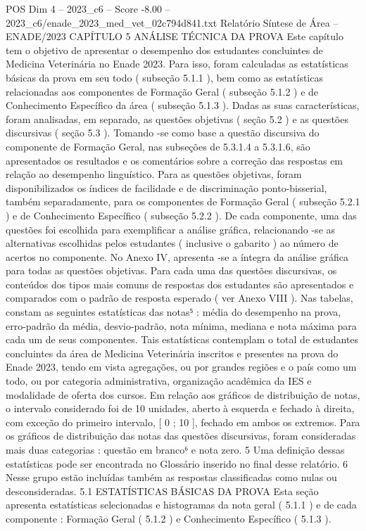 \begin{textsample}{POS Dim 4 – 2023\_c6 – Score -8.00 – 2023\_c6/enade\_2023\_med\_vet\_02c794d841.txt}  \label{ex:f4_pos_346}
Relatório Síntese de Área – ENADE/2023 CAPÍTULO 5 ANÁLISE TÉCNICA DA PROVA Este capítulo tem o objetivo de apresentar o desempenho dos estudantes concluintes de Medicina Veterinária no Enade 2023.
Para isso, foram calculadas as estatísticas básicas da prova em seu todo ( subseção 5.1.1 ), bem como as estatísticas relacionadas aos componentes de Formação Geral ( subseção 5.1.2 ) e de Conhecimento Específico da área ( subseção 5.1.3 ).
Dadas as suas características, foram analisadas, em separado, as questões objetivas ( seção 5.2 ) e as questões discursivas ( seção 5.3 ).
Tomando -se como base a questão discursiva do componente de Formação Geral, nas subseções de 5.3.1.4 a 5.3.1.6, são apresentados os resultados e os comentários sobre a correção das respostas em relação ao desempenho linguístico.
Para as questões objetivas, foram disponibilizados os índices de facilidade e de discriminação ponto-bisserial, também separadamente, para os componentes de Formação Geral ( subseção 5.2.1 ) e de Conhecimento Específico ( subseção 5.2.2 ).
De cada componente, uma das questões foi escolhida para exemplificar a análise gráfica, relacionando -se as alternativas escolhidas pelos estudantes ( inclusive o gabarito ) ao número de acertos no componente.
No Anexo IV, apresenta -se a íntegra da análise gráfica para todas as questões objetivas.
Para cada uma das questões discursivas, os conteúdos dos tipos mais comuns de respostas dos estudantes são apresentados e comparados com o padrão de resposta esperado ( ver Anexo VIII ).
Nas tabelas, constam as seguintes estatísticas das notas⁵ : média do desempenho na prova, erro-padrão da média, desvio-padrão, nota mínima, mediana e nota máxima para cada um de seus componentes.
Tais estatísticas contemplam o total de estudantes concluintes da área de Medicina Veterinária inscritos e presentes na prova do Enade 2023, tendo em vista agregações, ou por grandes regiões e o país como um todo, ou por categoria administrativa, organização acadêmica da IES e modalidade de oferta dos cursos.
Em relação aos gráficos de distribuição de notas, o intervalo considerado foi de 10 unidades, aberto à esquerda e fechado à direita, com exceção do primeiro intervalo, [ 0 ; 10 ], fechado em ambos os extremos.
Para os gráficos de distribuição das notas das questões discursivas, foram consideradas mais duas categorias : questão em branco⁶ e nota zero. 5 Uma definição dessas estatísticas pode ser encontrada no Glossário inserido no final desse relatório. 6 Nesse grupo estão incluídas também as respostas classificadas como nulas ou desconsideradas. 5.1 ESTATÍSTICAS BÁSICAS DA PROVA Esta seção apresenta estatísticas selecionadas e histogramas da nota geral ( 5.1.1 ) e de cada componente : Formação Geral ( 5.1.2 ) e Conhecimento Específico ( 5.1.3 ).

\end{textsample}
